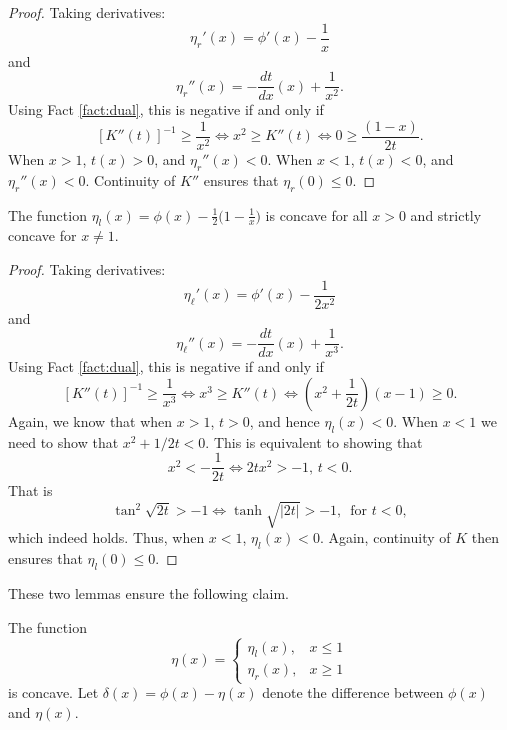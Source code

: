 \documentclass[12pt]{article}
\newcommand{\dd}[2]{\frac{d #1}{d #2}}
\begin{document}
\begin{proof}
Taking derivatives:
\[
\eta_r'(x) = \phi'(x) - \frac{1}{x}
\]
and
\[
\eta_r''(x) = - \dd{t}{x}(x) + \frac{1}{x^2}.
\]
Using Fact \ref{fact:dual}, this is negative if and only if
\[
[K''(t)]^{-1} \geq \frac{1}{x^2} \iff x^2 \geq K''(t) \iff 0 \geq \frac{(1-x)}{2t}.
\]
When $x > 1$, $t(x) > 0$, and $\eta_r''(x) < 0$.  When $x < 1$, $t(x) < 0$, and
$\eta_r''(x) < 0$.  Continuity of $K''$ ensures that $\eta_r(0) \leq 0$.
\end{proof}

\begin{lemma}
  The function $\eta_l(x) = \phi(x) - \frac{1}{2} \Big(1- \frac{1}{x}\Big)$ is concave for
  all $x > 0$ and strictly concave for $x \neq 1$.
\end{lemma}

\begin{proof}
Taking derivatives:
\[
\eta_\ell'(x) = \phi'(x) - \frac{1}{2x^2}
\]
and
\[
\eta_\ell''(x) = - \dd{t}{x}(x) + \frac{1}{x^3}.
\]
Using Fact \ref{fact:dual}, this is negative if and only if
\[
[K''(t)]^{-1} \geq \frac{1}{x^3} \iff x^3 \geq K''(t) \iff (x^2 +
\frac{1}{2t})(x-1) \geq 0.
\]
Again, we know that when $x > 1$, $t > 0$, and hence $\eta_l(x) < 0$.  When $x <
1$ we need to show that $x^2 + 1/2t < 0$.  This is equivalent to showing that
\[
x^2 < -\frac{1}{2t} \iff 2t x^2 > -1, \, t < 0.
\]
That is
\[
\tan^2{\sqrt{2t}} > -1 \iff \tanh{\sqrt{|2t|}} > -1, \, \text{ for } t < 0,
\]
which indeed holds.  Thus, when $x < 1$, $\eta_l(x) < 0$.  Again, continuity of
$K$ then ensures that $\eta_l(0) \leq 0$.
\end{proof}

These two lemmas ensure the following claim.
\begin{claim}
The function
\[
\eta(x) =
\begin{cases}
\eta_l(x), & x \leq 1 \\
\eta_r(x), & x \geq 1
\end{cases}
\]
is concave.  Let $\delta(x) = \phi(x) - \eta(x)$ denote the difference between
$\phi(x)$ and $\eta(x)$.
\end{claim}
\end{document}
